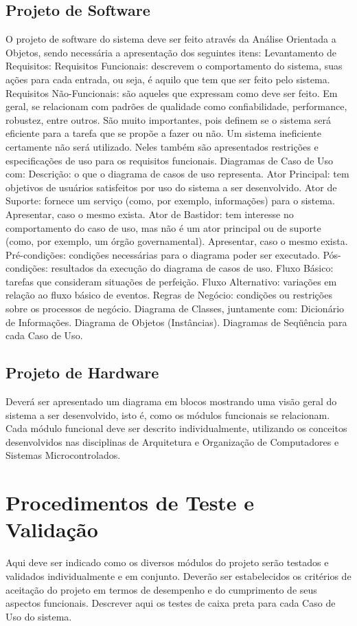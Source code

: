 \documentclass[a4paper,12pt]{article}
\begin{document}
\subsection{Projeto de Software}
O projeto de software do sistema deve ser feito através da Análise Orientada a Objetos, sendo necessária a apresentação dos seguintes itens:
Levantamento de Requisitos:
Requisitos Funcionais: descrevem o comportamento do sistema, suas ações para cada entrada, ou seja, é aquilo que tem que ser feito pelo sistema.
Requisitos Não-Funcionais: são aqueles que expressam como deve ser feito. Em geral, se relacionam com padrões de qualidade como confiabilidade, performance, robustez, entre outros. São muito importantes, pois definem se o sistema será eficiente para a tarefa que se propõe a fazer ou não. Um sistema ineficiente certamente não será utilizado. Neles também são apresentados restrições e especificações de uso para os requisitos funcionais.
Diagramas de Caso de Uso com:
Descrição: o que o diagrama de casos de uso representa.
Ator Principal: tem objetivos de usuários satisfeitos por uso do sistema a ser desenvolvido.
Ator de Suporte: fornece um serviço (como, por exemplo, informações) para o sistema. Apresentar, caso o mesmo exista.
Ator de Bastidor: tem interesse no comportamento do caso de uso, mas não é um ator principal ou de suporte (como, por exemplo, um órgão governamental). Apresentar, caso o mesmo exista.
Pré-condições: condições necessárias para o diagrama poder ser executado.
Pós-condições: resultados da execução do diagrama de casos de uso.
Fluxo Básico: tarefas que consideram situações de perfeição.
Fluxo Alternativo: variações em relação ao fluxo básico de eventos.
Regras de Negócio: condições ou restrições sobre os processos de negócio.
Diagrama de Classes, juntamente com:
Dicionário de Informações.
Diagrama de Objetos (Instâncias).
Diagramas de Seqüência para cada Caso de Uso.

\subsection{Projeto de Hardware}
Deverá ser apresentado um diagrama em blocos mostrando uma visão geral do sistema a ser desenvolvido, isto é, como os módulos funcionais se relacionam.
Cada módulo funcional deve ser descrito individualmente, utilizando os conceitos desenvolvidos nas disciplinas de Arquitetura e Organização de Computadores e Sistemas Microcontrolados.

\section{Procedimentos de Teste e Validação}
Aqui deve ser indicado como os diversos módulos do projeto serão testados e validados individualmente e em conjunto.
Deverão ser estabelecidos os critérios de aceitação do projeto em termos de desempenho e do cumprimento de seus aspectos funcionais.
Descrever aqui os testes de caixa preta para cada Caso de Uso do sistema.
\end{document}
